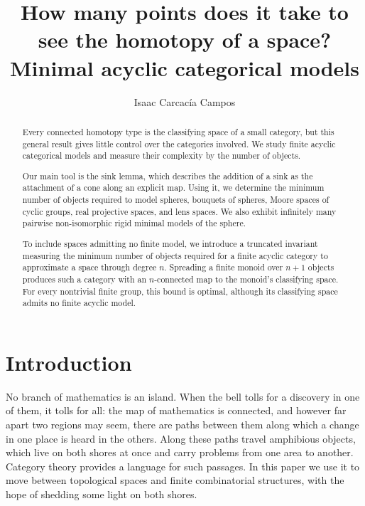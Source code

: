 \documentclass[12pt]{amsart}
\theoremstyle{definition}
\theoremstyle{remark}
\begin{document}
\title[Minimal acyclic categorical models]{How many points does it take to see the homotopy of a space?\\ Minimal acyclic categorical models}

\author[Isaac Carcac\'ia Campos]{%
Isaac Carcac\'ia Campos}
\address{%
Isaac Carcac\'ia Campos
\\
Departamento de Matem\'aticas, Universidade de Santiago de Compostela, 15782-SPAIN}

\begin{abstract}

Every connected homotopy type is the classifying space of a small category, but this general result gives little control over the categories involved. We study finite acyclic categorical models and measure their complexity by the number of objects.

Our main tool is the sink lemma, which describes the addition of a sink as the attachment of a cone along an explicit map. Using it, we determine the minimum number of objects required to model spheres, bouquets of spheres, Moore spaces of cyclic groups, real projective spaces, and lens spaces. We also exhibit infinitely many pairwise non-isomorphic rigid minimal models of the sphere.

To include spaces admitting no finite model, we introduce a truncated invariant measuring the minimum number of objects required for a finite acyclic category to approximate a space through degree $n$. Spreading a finite monoid over $n+1$ objects produces such a category with an $n$-connected map to the monoid's classifying space. For every nontrivial finite group, this bound is optimal, although its classifying space admits no finite acyclic model.
\end{abstract}



\maketitle

\section*{Introduction}

No branch of mathematics is an island. When the bell tolls for a discovery in one of them, it tolls for all: the map of mathematics is connected, and however far apart two regions may seem, there are paths between them along which a change in one place is heard in the others. Along these paths travel amphibious objects, which live on both shores at once and carry problems from one area to another. Category theory provides a language for such passages. In this paper we use it to move between topological spaces and finite combinatorial structures, with the hope of shedding some light on both shores.
\end{document}
